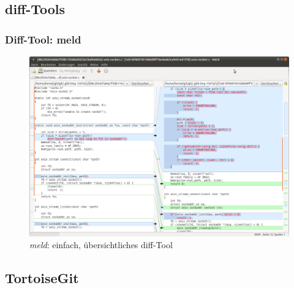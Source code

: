\documentclass{beamer}
\begin{document}
\subsection{diff-Tools}

\begin{frame}\frametitle{Diff-Tool: meld}

\begin{figure}
\includegraphics[scale=0.9]{Bilder/meld} 
\caption{\textit{meld}: einfach, übersichtliches diff-Tool}
\end{figure}
\end{frame}

\subsection{TortoiseGit}
\end{document}
